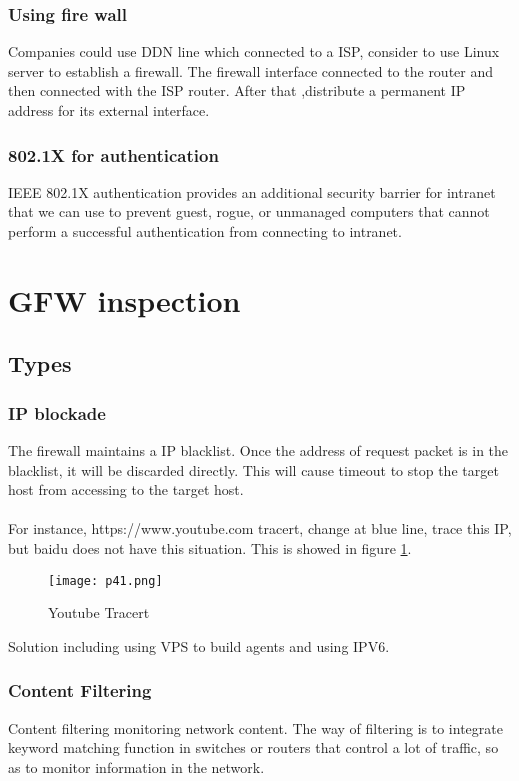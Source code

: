 \documentclass[paper=a4, fontsize=11pt]{scrartcl}
\numberwithin{equation}{section}
\numberwithin{figure}{section}
\numberwithin{table}{section}
\begin{document}
\subsubsection{Using fire wall}
Companies could use DDN line which connected to a ISP, consider to use Linux server to establish a firewall.  The firewall interface connected to the router and then connected with the ISP router. \cite{cn8} After that ,distribute a permanent IP address for its external interface.
\subsubsection{802.1X for authentication}
IEEE 802.1X authentication provides an additional security barrier for intranet that we can use to prevent guest, rogue, or unmanaged computers that cannot perform a successful authentication from connecting to intranet. \cite{cn6}
\section{GFW inspection}
\subsection{Types}
\subsubsection{IP blockade}
The firewall maintains a IP blacklist. Once the address of request packet is in the blacklist, it will be discarded directly. This will cause timeout to stop the target host from accessing to the target host.
\paragraph{}
For instance, https://www.youtube.com tracert, change at blue line, trace this IP, but baidu does not have this situation. This is showed in figure \ref{p41}.
\begin{figure}[!htb]
\centering
\texttt{[image: p41.png]}
\caption{Youtube Tracert}
\label{p41}
\end{figure}
Solution including using VPS to build agents and using IPV6.
\subsubsection{Content Filtering}
Content filtering monitoring network content. The way of filtering is to integrate keyword matching function in switches or routers that control a lot of traffic, so as to monitor information in the network.\cite{cn9}
\end{document}
